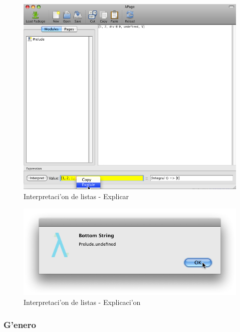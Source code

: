 \documentclass[a4paper]{article}
\begin{document}
\begin{figure}[hp]
	\begin{center}
        	\includegraphics[width=.75\textwidth]{pictures/lists02}
		\caption{Interpretaci'on de listas - Explicar}
		\label{etc2}
	\end{center}
\end{figure}
\begin{figure}[hp]
	\begin{center}
        	\includegraphics[width=.75\textwidth]{pictures/lists03}
		\caption{Interpretaci'on de listas - Explicaci'on}
		\label{etc3}
	\end{center}
\end{figure}

\newpage
\subsubsection{G'enero}
\end{document}
